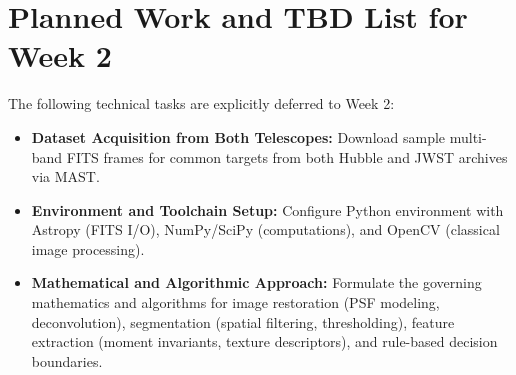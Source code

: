 \documentclass[11pt]{article}
\begin{document}

\section{Planned Work and TBD List for Week 2}

The following technical tasks are explicitly deferred to Week 2:
\begin{itemize}
    \item \textbf{Dataset Acquisition from Both Telescopes:} Download sample multi-band FITS
    frames for common targets from both Hubble and JWST archives via MAST.
    \item \textbf{Environment and Toolchain Setup:} Configure Python environment with Astropy
    (FITS I/O), NumPy/SciPy (computations), and OpenCV (classical image processing).
    \item \textbf{Mathematical and Algorithmic Approach:} Formulate the governing mathematics
    and algorithms for image restoration (PSF modeling, deconvolution), segmentation (spatial
    filtering, thresholding), feature extraction (moment invariants, texture descriptors),
    and rule-based decision boundaries.
\end{itemize}

\end{document}
